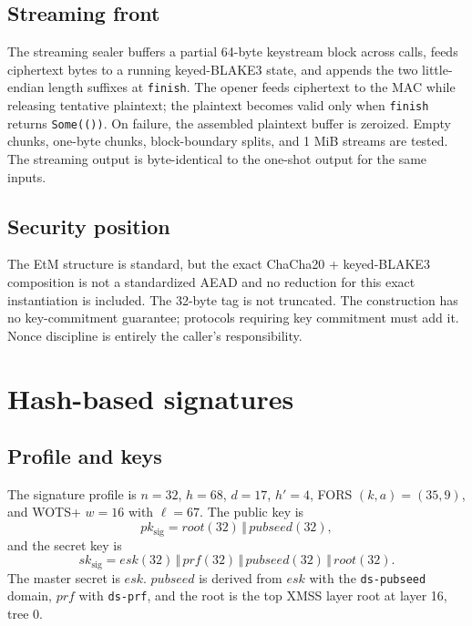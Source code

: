 \documentclass[11pt,a4paper]{article}
\theoremstyle{plain}
\theoremstyle{definition}
\theoremstyle{remark}
\newcommand{\concat}{\,\Vert\,}
\begin{document}
\subsection{Streaming front}

The streaming sealer buffers a partial 64-byte keystream block across
calls, feeds ciphertext bytes to a running keyed-BLAKE3 state, and
appends the two little-endian length suffixes at \texttt{finish}.  The
opener feeds ciphertext to the MAC while releasing tentative plaintext;
the plaintext becomes valid only when \texttt{finish} returns
\texttt{Some(())}.  On failure, the assembled plaintext buffer is
zeroized.  Empty chunks, one-byte chunks, block-boundary splits, and
1 MiB streams are tested.  The streaming output is byte-identical to
the one-shot output for the same inputs.

\subsection{Security position}

The EtM structure is standard, but the exact ChaCha20 + keyed-BLAKE3
composition is not a standardized AEAD and no reduction for this exact
instantiation is included.  The 32-byte tag is not truncated.  The
construction has no key-commitment guarantee; protocols requiring key
commitment must add it.  Nonce discipline is entirely the caller's
responsibility.

\section{Hash-based signatures}
\label{sec:ds}

\subsection{Profile and keys}

The signature profile is $n=32$, $h=68$, $d=17$, $h'=4$, FORS
$(k,a)=(35,9)$, and WOTS+ $w=16$ with $\ell=67$.  The public key is
\[
 pk_{\mathrm{sig}}=\mathit{root}(32)\concat\mathit{pubseed}(32),
\]
and the secret key is
\[
 sk_{\mathrm{sig}}=\mathit{esk}(32)\concat\mathit{prf}(32)
 \concat\mathit{pubseed}(32)\concat\mathit{root}(32).
\]
The master secret is $\mathit{esk}$.  $\mathit{pubseed}$ is derived
from $\mathit{esk}$ with the \texttt{ds-pubseed} domain, $\mathit{prf}$
with \texttt{ds-prf}, and the root is the top XMSS layer root at layer
16, tree 0.
\end{document}
